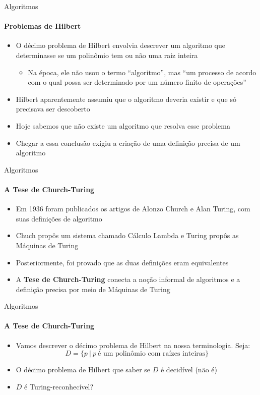 \documentclass{beamer}
\begin{document}
\begin{frame}{Algoritmos}
	\framesubtitle{Problemas de Hilbert}
	\begin{itemize}
		\item O décimo problema de Hilbert envolvia descrever um algoritmo que determinasse se um polinômio tem ou não uma raiz inteira
		\begin{itemize}
			\item Na época, ele não usou o termo ``algoritmo'', mas ``um processo de acordo com o qual possa ser determinado por um número finito de operações''
		\end{itemize}
		\item Hilbert aparentemente assumiu que o algoritmo deveria existir e que só precisava ser descoberto
		\item Hoje sabemos que não existe um algoritmo que resolva esse problema
		\item Chegar a essa conclusão exigiu a criação de uma definição precisa de um algoritmo
	\end{itemize}
\end{frame}
\begin{frame}{Algoritmos}
	\framesubtitle{A Tese de Church-Turing}
	\begin{itemize}
		\item Em 1936 foram publicados os artigos de Alonzo Church e Alan Turing, com suas definições de algoritmo
		\item Chuch propôs um sistema chamado Cálculo Lambda e Turing propôs as Máquinas de Turing
		\item Posteriormente, foi provado que as duas definições eram equivalentes
		\item A \textbf{Tese de Church-Turing} conecta a noção informal de algoritmos e a definição precisa por meio de Máquinas de Turing
	\end{itemize}
\end{frame}
\begin{frame}{Algoritmos}
	\framesubtitle{A Tese de Church-Turing}
	\begin{itemize}
		\item Vamos descrever o décimo problema de Hilbert na nossa terminologia. Seja:
		\begin{equation*}
			D = \{p\ |\ p\ \text{é um polinômio com raízes inteiras}\}
		\end{equation*}
		\item O décimo problema de Hilbert que saber se $D$ é decidível (não é)
		\item $D$ é Turing-reconhecível?
	\end{itemize}
\end{frame}
\end{document}
